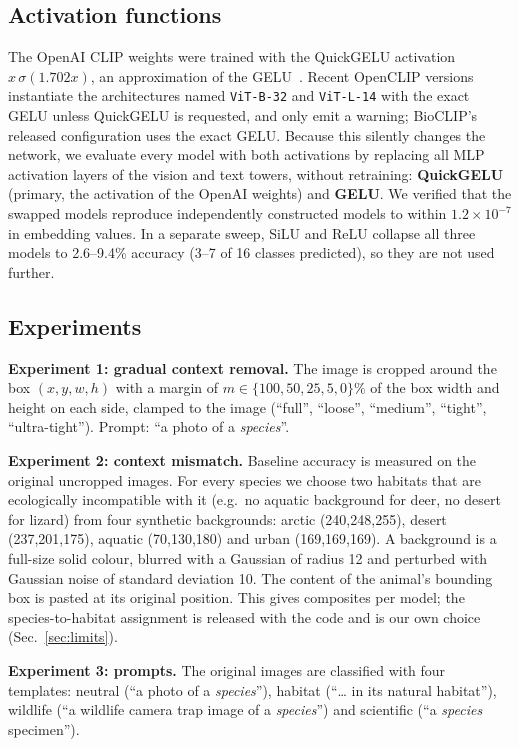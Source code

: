 \documentclass[conference]{IEEEtran}
\begin{document}
\subsection{Activation functions}
The OpenAI CLIP weights were trained with the QuickGELU activation $x\,\sigma(1.702x)$, an approximation of the GELU~\cite{hendrycks2016}. Recent OpenCLIP versions instantiate the architectures named \texttt{ViT-B-32} and \texttt{ViT-L-14} with the exact GELU unless QuickGELU is requested, and only emit a warning; BioCLIP's released configuration uses the exact GELU. Because this silently changes the network, we evaluate every model with both activations by replacing all MLP activation layers of the vision and text towers, without retraining: \textbf{QuickGELU} (primary, the activation of the OpenAI weights) and \textbf{GELU}. We verified that the swapped models reproduce independently constructed models to within $1.2\times10^{-7}$ in embedding values. In a separate sweep, SiLU and ReLU collapse all three models to \mbox{2.6--9.4\%} accuracy (3--7 of 16 classes predicted), so they are not used further.

\subsection{Experiments}
\textbf{Experiment 1: gradual context removal.} The image is cropped around the box $(x,y,w,h)$ with a margin of $m\in\{100,50,25,5,0\}\%$ of the box width and height on each side, clamped to the image (``full'', ``loose'', ``medium'', ``tight'', ``ultra-tight''). Prompt: ``a photo of a \emph{species}''.

\textbf{Experiment 2: context mismatch.} Baseline accuracy is measured on the original uncropped images. For every species we choose two habitats that are ecologically incompatible with it (e.g.\ no aquatic background for deer, no desert for lizard) from four synthetic backgrounds: arctic (240,248,255), desert (237,201,175), aquatic (70,130,180) and urban (169,169,169). A background is a full-size solid colour, blurred with a Gaussian of radius 12 and perturbed with Gaussian noise of standard deviation 10. The content of the animal's bounding box is pasted at its original position. This gives \NMismatch{} composites per model; the species-to-habitat assignment is released with the code and is our own choice (Sec.~\ref{sec:limits}).

\textbf{Experiment 3: prompts.} The original images are classified with four templates: neutral (``a photo of a \emph{species}''), habitat (``\ldots{} in its natural habitat''), wildlife (``a wildlife camera trap image of a \emph{species}'') and scientific (``a \emph{species} specimen'').
\end{document}
